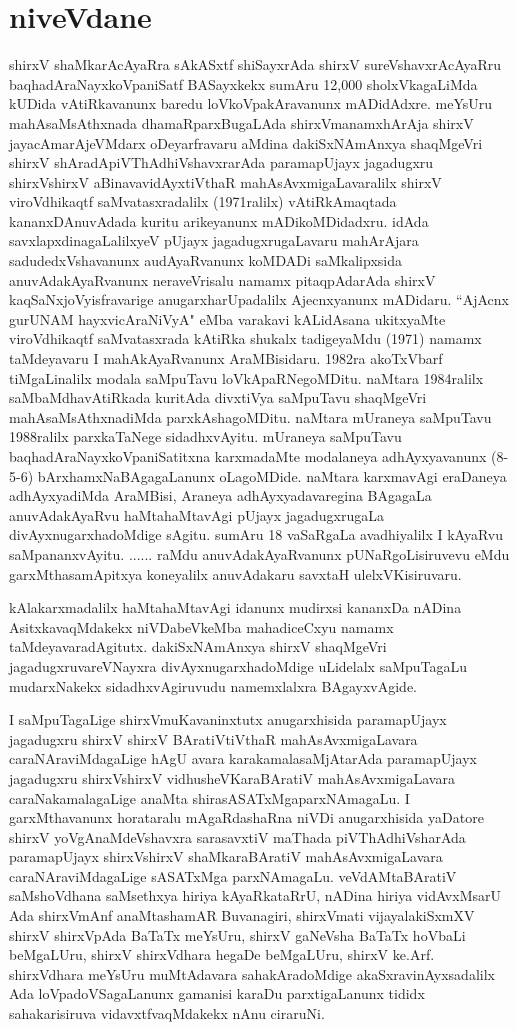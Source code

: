 \chapter{niveVdane}

shirxV shaMkarAcAyaRra sAkASxtf shiSayxrAda shirxV sureVshavxrAcAyaRru baqhadAraNayxkoVpaniSatf BASayxkekx sumAru 12,000 sholxVkagaLiMda kUDida vAtiRkavanunx baredu loVkoVpakAravanunx mADidAdxre. meYsUru mahAsaMsAthxnada dhamaRparxBugaLAda shirxVmanamxhArAja shirxV jayacAmarAjeVMdarx oDeyarfravaru aMdina dakiSxNAmAnxya shaqMgeVri shirxV shAradApiVThAdhiVshavxrarAda paramapUjayx jagadugxru shirxVshirxV aBinavavidAyxtiVthaR mahAsAvxmigaLavaralilx shirxV viroVdhikaqtf saMvatasxradalilx (1971ralilx) vAtiRkAmaqtada kananxDAnuvAdada kuritu arikeyanunx mADikoMDidadxru. idAda savxlapxdinagaLalilxyeV pUjayx jagadugxrugaLavaru mahArAjara sadudedxVshavanunx audAyaRvanunx koMDADi saMkalipxsida anuvAdakAyaRvanunx neraveVrisalu namamx pitaqpAdarAda shirxV kaqSaNxjoVyisfravarige anugarxharUpadalilx Ajecnxyanunx mADidaru. “AjAcnx gurUNAM hayxvicAraNiVyA" eMba varakavi kALidAsana ukitxyaMte viroVdhikaqtf saMvatasxrada kAtiRka shukalx tadigeyaMdu (1971) namamx taMdeyavaru I mahAkAyaRvanunx AraMBisidaru. 1982ra akoTxVbarf tiMgaLinalilx modala saMpuTavu loVkApaRNegoMDitu. naMtara 1984ralilx saMbaMdhavAtiRkada kuritAda divxtiVya saMpuTavu shaqMgeVri mahAsaMsAthxnadiMda parxkAshagoMDitu. naMtara mUraneya saMpuTavu 1988ralilx parxkaTaNege sidadhxvAyitu. mUraneya saMpuTavu baqhadAraNayxkoVpaniSatitxna karxmadaMte modalaneya adhAyxyavanunx (8-5-6) bArxhamxNaBAgagaLanunx oLagoMDide. naMtara karxmavAgi eraDaneya adhAyxyadiMda AraMBisi, Araneya adhAyxyadavaregina BAgagaLa anuvAdakAyaRvu haMtahaMtavAgi pUjayx jagadugxrugaLa divAyxnugarxhadoMdige sAgitu. sumAru 18 vaSaRgaLa avadhiyalilx I kAyaRvu saMpananxvAyitu. ...... raMdu anuvAdakAyaRvanunx pUNaRgoLisiruvevu eMdu garxMthasamApitxya koneyalilx anuvAdakaru savxtaH ulelxVKisiruvaru. 

kAlakarxmadalilx haMtahaMtavAgi idanunx mudirxsi kananxDa nADina AsitxkavaqMdakekx niVDabeVkeMba mahadiceCxyu namamx taMdeyavaradAgitutx. dakiSxNAmAnxya shirxV shaqMgeVri jagadugxruvareVNayxra divAyxnugarxhadoMdige uLidelalx saMpuTagaLu mudarxNakekx sidadhxvAgiruvudu namemxlalxra BAgayxvAgide.

I saMpuTagaLige shirxVmuKavaninxtutx anugarxhisida paramapUjayx jagadugxru shirxV shirxV BAratiVtiVthaR mahAsAvxmigaLavara caraNAraviMdagaLige hAgU avara karakamalasaMjAtarAda paramapUjayx jagadugxru shirxVshirxV vidhusheVKaraBAratiV mahAsAvxmigaLavara caraNakamalagaLige anaMta shirasASATxMgaparxNAmagaLu. I garxMthavanunx horataralu mAgaRdashaRna niVDi anugarxhisida yaDatore shirxV yoVgAnaMdeVshavxra sarasavxtiV maThada piVThAdhiVsharAda paramapUjayx shirxVshirxV shaMkaraBAratiV mahAsAvxmigaLavara caraNAraviMdagaLige sASATxMga parxNAmagaLu. veVdAMtaBAratiV saMshoVdhana saMsethxya hiriya kAyaRkataRrU, nADina hiriya vidAvxMsarU Ada shirxVmAnf anaMtashamAR Buvanagiri, shirxVmati vijayalakiSxmXV shirxV shirxVpAda BaTaTx meYsUru, shirxV gaNeVsha BaTaTx hoVbaLi beMgaLUru, shirxV shirxVdhara hegaDe beMgaLUru, shirxV ke.Arf. shirxVdhara meYsUru muMtAdavara sahakAradoMdige akaSxravinAyxsadalilx Ada loVpadoVSagaLanunx gamanisi karaDu parxtigaLanunx tididx sahakarisiruva vidavxtfvaqMdakekx nAnu ciraruNi. 

